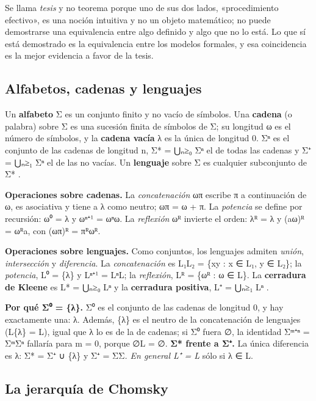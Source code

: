 Se llama \emph{tesis} y no teorema porque uno de sus dos lados, «procedimiento efectivo», es una noción intuitiva y no un objeto matemático; no puede demostrarse una equivalencia entre algo definido y algo que no lo está. Lo que sí está demostrado es la equivalencia entre los modelos formales, y esa coincidencia es la mejor evidencia a favor de la tesis.

\hypertarget{alfabetos-cadenas-y-lenguajes}{%
\subsection{Alfabetos, cadenas y lenguajes}\label{alfabetos-cadenas-y-lenguajes}}

Un \textbf{alfabeto} Σ es un conjunto finito y no vacío de símbolos. Una \textbf{cadena} (o palabra) sobre Σ es una sucesión finita de símbolos de Σ; su longitud \textbar ω\textbar{} es el número de símbolos, y la \textbf{cadena vacía} λ es la única de longitud 0. Σⁿ es el conjunto de las cadenas de longitud n, Σ* = ⋃ₙ≥₀ Σⁿ el de todas las cadenas y Σ⁺ = ⋃ₙ≥₁ Σⁿ el de las no vacías. Un \textbf{lenguaje} sobre Σ es cualquier subconjunto de Σ* \autocite[sec.~1.5]{hopcroft2007}.

\textbf{Operaciones sobre cadenas.} La \emph{concatenación} ωπ escribe π a continuación de ω, es asociativa y tiene a λ como neutro; \textbar ωπ\textbar{} = \textbar ω\textbar{} + \textbar π\textbar. La \emph{potencia} se define por recursión: ω⁰ = λ y ωⁿ⁺¹ = ωⁿω. La \emph{reflexión} ωᴿ invierte el orden: λᴿ = λ y (aω)ᴿ = ωᴿa, con (ωπ)ᴿ = πᴿωᴿ.

\textbf{Operaciones sobre lenguajes.} Como conjuntos, los lenguajes admiten \emph{unión}, \emph{intersección} y \emph{diferencia}. La \emph{concatenación} es L₁L₂ = \{xy : x ∈ L₁, y ∈ L₂\}; la \emph{potencia}, L⁰ = \{λ\} y Lⁿ⁺¹ = LⁿL; la \emph{reflexión}, Lᴿ = \{ωᴿ : ω ∈ L\}. La \textbf{cerradura de Kleene} es L* = ⋃ₙ≥₀ Lⁿ y la \textbf{cerradura positiva}, L⁺ = ⋃ₙ≥₁ Lⁿ \autocite[sec.~1.2]{linz2017}.

\textbf{Por qué Σ⁰ = \{λ\}.} Σ⁰ es el conjunto de las cadenas de longitud 0, y hay exactamente una: λ. Además, \{λ\} es el neutro de la concatenación de lenguajes (L\{λ\} = L), igual que λ lo es de la de cadenas; si Σ⁰ fuera ∅, la identidad Σᵐ⁺ⁿ = ΣᵐΣⁿ fallaría para m = 0, porque ∅L = ∅. \textbf{Σ* frente a Σ⁺.} La única diferencia es λ: Σ* = Σ⁺ ∪ \{λ\} y Σ⁺ = ΣΣ\emph{. En general L⁺ = L} sólo si λ ∈ L.

\hypertarget{la-jerarquuxeda-de-chomsky}{%
\subsection{La jerarquía de Chomsky}\label{la-jerarquuxeda-de-chomsky}}

